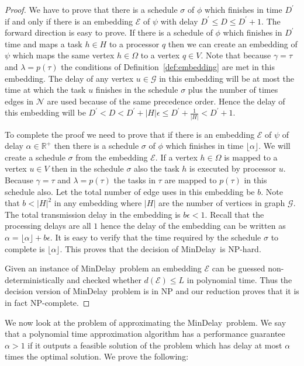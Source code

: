 \documentclass[journal]{IEEEtran}
\newcommand{\net}{\mathcal{N}}
\newcommand{\netnodes}{V}
\newcommand{\compgraph}{\mathcal{G}}
\newcommand{\compnodes}{\Omega}
\newcommand{\mindelay}{\textsf{MinDelay}}
\newcommand{\embedding}{\mathcal{E}}
\begin{document}
\begin{proof}
  We have to prove that there is a schedule $\sigma$ of $\phi$ which
  finishes in time $D^{\prime}$ if and only if there is an embedding
  $\embedding$ of $\psi$ with delay $D^{\prime} \leq D \leq
  D^{\prime}+1.$ The forward direction is easy to prove. If there is a
  schedule of $\phi$ which finishes in $D^{\prime}$ time and maps a
  task $h \in H$ to a processor $q$ then we can create an embedding of
  $\psi$ which maps the same vertex $h \in \compnodes$ to a vertex $q
  \in \netnodes.$ Note that because $\gamma = \tau$ and $\lambda =
  p(\tau)$ the conditions of Definition~\ref{def:embedding} are met in
  this embedding. The delay of any vertex $u \in \compgraph$ in this
  embedding will be at most the time at which the task $u$ finishes in
  the schedule $\sigma$ plus the number of times edges in $\net$ are
  used because of the same precedence order. Hence the delay of this
  embedding will be $D^{\prime} < D < D^{\prime}+ |H|\epsilon \leq
  D^{\prime} + \frac{1}{|H|} < D^{\prime} +1.$

  To complete the proof we need to prove that if there is an embedding
  $\embedding$ of $\psi$ of delay $\alpha \in \mathbb{R}^+$ then there
  is a schedule $\sigma$ of $\phi$ which finishes in time $\lfloor
  \alpha \rfloor.$ We will create a schedule $\sigma$ from the
  embedding $\embedding.$ If a vertex $h \in \compnodes$ is mapped to
  a vertex $u \in \netnodes$ then in the schedule $\sigma$ also the
  task $h$ is executed by processor $u.$ Because $\gamma = \tau$ and
  $\lambda = p(\tau)$ the tasks in $\tau$ are mapped to $p(\tau)$ in
  this schedule also. Let the total number of edge uses in this
  embedding be $b.$ Note that $b < |H|^2$ in any embedding where $|H|$
  are the number of vertices in graph $\compgraph.$ The total
  transmission delay in the embedding is $b \epsilon < 1.$ Recall that
  the processing delays are all $1$ hence the delay of the embedding
  can be written as $\alpha = \lfloor \alpha \rfloor + b \epsilon.$ It
  is easy to verify that the time required by the schedule $\sigma$ to
  complete is $\lfloor \alpha \rfloor.$ This proves that the decision
  of \mindelay\ is NP-hard.

  Given an instance of \mindelay\ problem an embedding $\embedding$
  can be guessed non-deterministically and checked whether
  $d(\embedding) \leq L$ in polynomial time. Thus the decision version
  of \mindelay\ problem is in NP and our reduction proves that it is
  in fact NP-complete.
\end{proof}

We now look at the problem of approximating the \mindelay\ problem. We
say that a polynomial time approximation algorithm has a performance
guarantee $\alpha >1$ if it outputs a feasible solution of the problem
which has delay at most $\alpha$ times the optimal solution.  We prove
the following:
\end{document}
